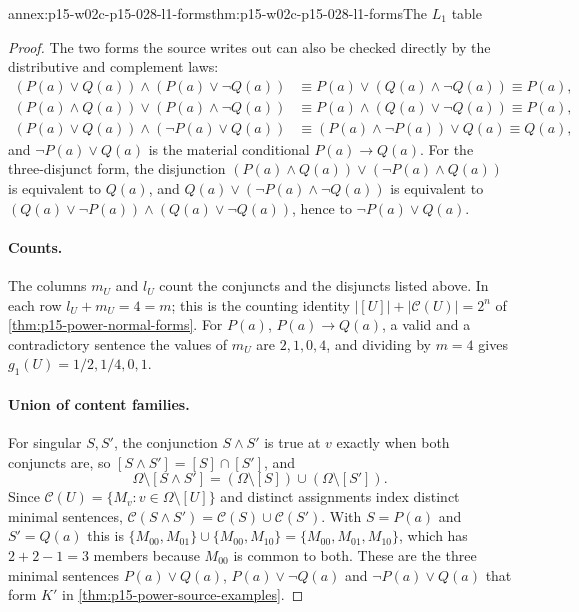 \begin{annexitem}{annex:p15-w02c-p15-028-l1-forms}{thm:p15-w02c-p15-028-l1-forms}{The \(L_1\) table}
\begin{proof}
The two forms the source writes out can also be checked directly by
the distributive and complement laws:
\[
\begin{aligned}
 (P(a)\lor Q(a))\land(P(a)\lor\neg Q(a))
   &\equiv P(a)\lor(Q(a)\land\neg Q(a))\equiv P(a),\\
 (P(a)\land Q(a))\lor(P(a)\land\neg Q(a))
   &\equiv P(a)\land(Q(a)\lor\neg Q(a))\equiv P(a),\\
 (P(a)\lor Q(a))\land(\neg P(a)\lor Q(a))
   &\equiv (P(a)\land\neg P(a))\lor Q(a)\equiv Q(a),
\end{aligned}
\]
and \(\neg P(a)\lor Q(a)\) is the material conditional
\(P(a)\to Q(a)\). For the three-disjunct form, the disjunction
\((P(a)\land Q(a))\lor(\neg P(a)\land Q(a))\) is equivalent to
\(Q(a)\), and \(Q(a)\lor(\neg P(a)\land\neg Q(a))\) is equivalent to
\((Q(a)\lor\neg P(a))\land(Q(a)\lor\neg Q(a))\), hence to
\(\neg P(a)\lor Q(a)\).

\paragraph{Counts.}
The columns \(m_U\) and \(l_U\) count the conjuncts and the
disjuncts listed above. In each row \(l_U+m_U=4=m\); this is the counting
identity \(|[U]|+|\mathcal C(U)|=2^n\) of
\cref{thm:p15-power-normal-forms}. For \(P(a)\), \(P(a)\to Q(a)\), a
valid and a contradictory sentence the values of \(m_U\) are
\(2,1,0,4\), and dividing by \(m=4\) gives \(g_1(U)=1/2,1/4,0,1\).

\paragraph{Union of content families.}
For singular \(S,S'\), the conjunction \(S\land S'\) is true at \(v\)
exactly when both conjuncts are, so \([S\land S']=[S]\cap[S']\), and
\[
 \Omega\setminus[S\land S']
   =(\Omega\setminus[S])\cup(\Omega\setminus[S']).
\]
Since \(\mathcal C(U)=\{M_v:v\in\Omega\setminus[U]\}\) and distinct
assignments index distinct minimal sentences,
\(\mathcal C(S\land S')=\mathcal C(S)\cup\mathcal C(S')\). With
\(S=P(a)\) and \(S'=Q(a)\) this is
\(\{M_{00},M_{01}\}\cup\{M_{00},M_{10}\}=\{M_{00},M_{01},M_{10}\}\),
which has \(2+2-1=3\) members because \(M_{00}\) is common to both. These
are the three minimal sentences \(P(a)\lor Q(a)\), \(P(a)\lor\neg Q(a)\)
and \(\neg P(a)\lor Q(a)\) that form \(K'\) in
\cref{thm:p15-power-source-examples}.
\end{proof}
\end{annexitem}

